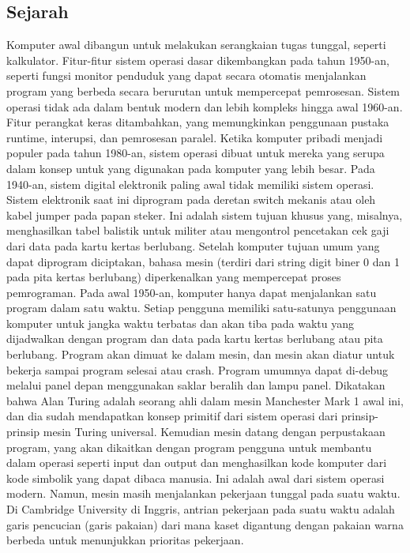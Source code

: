\subsection{Sejarah}
	\begin{enumerate}
		Komputer awal dibangun untuk melakukan serangkaian tugas tunggal, seperti kalkulator. Fitur-fitur sistem operasi dasar dikembangkan pada tahun 1950-an, seperti fungsi monitor penduduk yang dapat secara otomatis menjalankan program yang berbeda secara berurutan untuk mempercepat pemrosesan. Sistem operasi tidak ada dalam bentuk modern dan lebih kompleks hingga awal 1960-an. Fitur perangkat keras ditambahkan, yang memungkinkan penggunaan pustaka runtime, interupsi, dan pemrosesan paralel. Ketika komputer pribadi menjadi populer pada tahun 1980-an, sistem operasi dibuat untuk mereka yang serupa dalam konsep untuk yang digunakan pada komputer yang lebih besar.
		Pada 1940-an, sistem digital elektronik paling awal tidak memiliki sistem operasi. Sistem elektronik saat ini diprogram pada deretan switch mekanis atau oleh kabel jumper pada papan steker. Ini adalah sistem tujuan khusus yang, misalnya, menghasilkan tabel balistik untuk militer atau mengontrol pencetakan cek gaji dari data pada kartu kertas berlubang. Setelah komputer tujuan umum yang dapat diprogram diciptakan, bahasa mesin (terdiri dari string digit biner 0 dan 1 pada pita kertas berlubang) diperkenalkan yang mempercepat proses pemrograman.
		Pada awal 1950-an, komputer hanya dapat menjalankan satu program dalam satu waktu. Setiap pengguna memiliki satu-satunya penggunaan komputer untuk jangka waktu terbatas dan akan tiba pada waktu yang dijadwalkan dengan program dan data pada kartu kertas berlubang atau pita berlubang. Program akan dimuat ke dalam mesin, dan mesin akan diatur untuk bekerja sampai program selesai atau crash. Program umumnya dapat di-debug melalui panel depan menggunakan saklar beralih dan lampu panel. Dikatakan bahwa Alan Turing adalah seorang ahli dalam mesin Manchester Mark 1 awal ini, dan dia sudah mendapatkan konsep primitif dari sistem operasi dari prinsip-prinsip mesin Turing universal.
		Kemudian mesin datang dengan perpustakaan program, yang akan dikaitkan dengan program pengguna untuk membantu dalam operasi seperti input dan output dan menghasilkan kode komputer dari kode simbolik yang dapat dibaca manusia. Ini adalah awal dari sistem operasi modern. Namun, mesin masih menjalankan pekerjaan tunggal pada suatu waktu. Di Cambridge University di Inggris, antrian pekerjaan pada suatu waktu adalah garis pencucian (garis pakaian) dari mana kaset digantung dengan pakaian warna berbeda untuk menunjukkan prioritas pekerjaan. 
	\end{enumerate}
